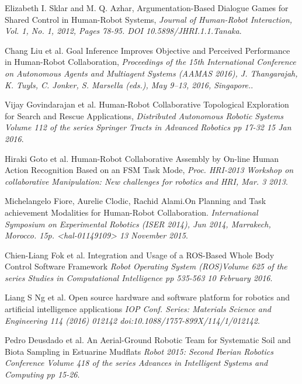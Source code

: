 \documentclass{report}
\begin{document}
  \begin{thebibliography}{9}

      Elizabeth I. Sklar and M. Q. Azhar, Argumentation-Based Dialogue Games for Shared Control in Human-Robot Systems,
      \emph{Journal of Human-Robot Interaction, Vol. 1, No. 1, 2012, Pages 78-95. DOI 10.5898/JHRI.1.1.Tanaka}.

      Chang Liu et al. Goal Inference Improves Objective and Perceived Performance in Human-Robot Collaboration, 
      \emph{Proceedings of the 15th International Conference on Autonomous Agents and Multiagent Systems (AAMAS 2016), J. Thangarajah, K. Tuyls, C. Jonker, S. Marsella (eds.), May 9–13, 2016, Singapore.}.

      Vijay Govindarajan et al. Human-Robot Collaborative Topological Exploration for Search and Rescue Applications,
      \emph{Distributed Autonomous Robotic Systems Volume 112 of the series Springer Tracts in Advanced Robotics pp 17-32 15 Jan 2016}.

      Hiraki Goto et al. Human-Robot Collaborative Assembly by On-line Human Action Recognition Based on an FSM Task Mode,
      \emph{Proc. HRI-2013 Workshop on collaborative Manipulation: New challenges for robotics and HRI, Mar. 3 2013}.

      Michelangelo Fiore, Aurelie Clodic, Rachid Alami.On Planning and Task achievement Modalities for Human-Robot Collaboration. \emph{International Symposium on Experimental Robotics (ISER 2014), Jun 2014, Marrakech, Morocco. 15p. <hal-01149109> 13 November 2015}.

      Chien-Liang Fok et al. Integration and Usage of a ROS-Based Whole Body Control Software Framework
      \emph{Robot Operating System (ROS)Volume 625 of the series Studies in Computational Intelligence pp 535-563 10 February 2016}.

      Liang S Ng et al. Open source hardware and software platform for robotics and artificial intelligence applications
      \emph{IOP Conf. Series: Materials Science and Engineering 114 (2016) 012142 doi:10.1088/1757-899X/114/1/012142}.

      Pedro Deusdado et al. An Aerial-Ground Robotic Team for Systematic Soil and Biota Sampling in Estuarine Mudflats
      \emph{Robot 2015: Second Iberian Robotics Conference Volume 418 of the series Advances in Intelligent Systems and Computing pp 15-26}.


\end{thebibliography}
\end{document}
